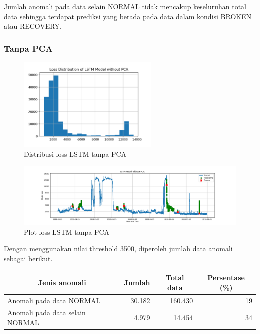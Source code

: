     Jumlah anomali pada data selain NORMAL tidak mencakup keseluruhan total data sehingga terdapat prediksi yang berada pada data dalam kondisi BROKEN atau RECOVERY.

    \subsubsection{Tanpa PCA}

    \begin{figure}[h]
        \centering
        \includegraphics[width=0.6\textwidth]{resources/LSTM/LSTM_noPCA_LossDist.png}
        \caption{Distribusi loss LSTM tanpa PCA}
    \end{figure}

    \begin{figure}[h]
        \centerline{\includegraphics[width=1.4\textwidth]{resources/LSTM/LSTM_noPCA_model_loss.png}}
        \caption{Plot loss LSTM tanpa PCA}
    \end{figure}

    Dengan menggunakan nilai threshold 3500, diperoleh jumlah data anomali sebagai berikut.

    \begin{table}[h]
        \centering
        \begin{tabular}{|l|r|r|r|}
            \hline
            \multicolumn{1}{|c|}{\textbf{Jenis anomali}} & \multicolumn{1}{c|}{\textbf{Jumlah}} & \multicolumn{1}{c|}{\textbf{Total data}} & \multicolumn{1}{c|}{\textbf{Persentase (\%)}} \\ \hline
            Anomali pada data NORMAL                     & 30.182                                & 160.430                                   & 19                                       \\ \hline
            Anomali pada data selain NORMAL              & 4.979                                 & 14.454                                    & 34                                       \\ \hline
        \end{tabular}
    \end{table}

